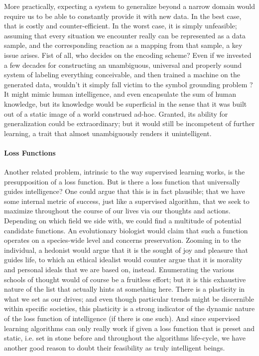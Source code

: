 \documentclass[]{article}
\begin{document}
More practically, expecting a system to generalize beyond a narrow domain would require us to be able to constantly provide it with new data. In the best case, that is costly and counter-efficient. In the worst case, it is simply unfeasible; assuming that every situation we encounter really can be represented as a data sample, and the corresponding reaction as a mapping from that sample, a key issue arises. Fist of all, who decides on the encoding scheme? Even if we invested a few decades for constructing an unambiguous, universal and properly sound system of labeling everything conceivable, and then trained a machine on the generated data, wouldn't it simply fall victim to the symbol grounding problem \cite{Fodor}? It might mimic human intelligence, and even encapsulate the sum of human knowledge, but its knowledge would be superficial in the sense that it was built out of a static image of a world construed ad-hoc. Granted, its ability for generalization could be extraordinary; but it would still be incompetent of further learning, a trait that almost unambiguously renders it unintelligent.

\paragraph{Loss Functions}
Another related problem, intrinsic to the way supervised learning works, is the presupposition of a loss function. But is there a loss function that universally guides intelligence? One could argue that this is in fact plausible; that we have some internal metric of success, just like a supervised algorithm, that we seek to maximize throughout the course of our lives via our thoughts and actions. Depending on which field we side with, we could find a multitude of potential candidate functions. An evolutionary biologist would claim that such a function operates on a species-wide level and concerns preservation. Zooming in to the individual, a hedonist would argue that it is the sought of joy and pleasure that guides life, to which an ethical idealist would counter argue that it is morality and personal ideals that we are based on, instead. Enumerating the various schools of thought would of course be a fruitless effort; but it is this exhaustive nature of the list that actually hints at something here. There is a plasticity in what we set as our drives; and even though particular trends might be discernible within specific societies, this plasticity is a strong indicator of the dynamic nature of the loss function of intelligence (if there is one such). And since supervised learning algorithms can only really work if given a loss function that is preset and static, i.e. set in stone before and throughout the algorithms life-cycle, we have another good reason to doubt their feasibility as truly intelligent beings.
\end{document}
